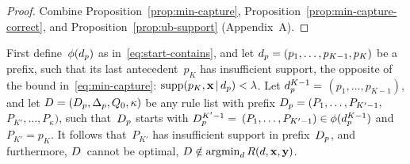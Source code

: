 \begin{arxiv}
\begin{proof}
Combine Proposition~\ref{prop:min-capture}, Proposition~\ref{prop:min-capture-correct},
and Proposition~\ref{prop:ub-support} (Appendix~A).
\end{proof}

\begin{proposition}
\label{prop:min-capture}
First define~$\phi(d_p)$ as in~\eqref{eq:start-contains},
and let ${d_p = (p_1, \dots, p_{K-1}, p_{K})}$ be a prefix,
such that its last antecedent~$p_{K}$ has insufficient support,
\ie the opposite of the bound in~\eqref{eq:min-capture}:
${\textnormal{supp}(p_K, \mathbf{x} \,|\, d_p) < {\lambda}}$.
%
Let ${d_p^{K-1} =}$ ${(p_1, \dots, p_{K-1})}$,
and let ${{D} = (D_p, \Delta_p, Q_0, \kappa)}$
be any rule list with prefix
${D_p = (P_1, \dots, P_{K'-1},}$ ${P_{K'}, \dots, P_{\kappa})}$,
such that~$D_p$ starts with ${D_p^{K'-1} =}$
${(P_1, \dots, P_{K'-1}) \in \phi(d_p^{K-1})}$
and~${P_{K'} = p_{K}}$.
%
It follows that~$P_{K'}$ has insufficient support in
prefix~$D_p$, and furthermore, ${D}$~cannot be optimal,
\ie ${{D} \notin \operatorname*{argmin}_{{d}} R({d}, \mathbf{x}, \mathbf{y})}$.
\end{proposition}


\end{arxiv}
